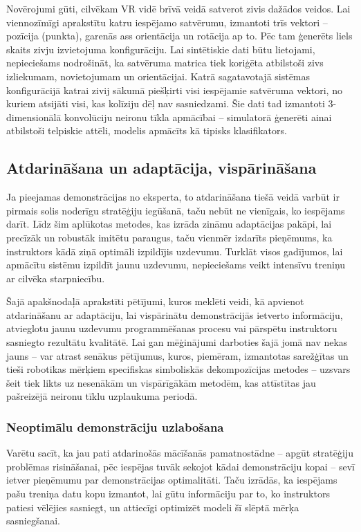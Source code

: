 \documentclass[12pt, a4paper]{article}
\numberwithin{equation}{section} %
\begin{document}
Novērojumi gūti, cilvēkam VR vidē brīvā veidā satverot zivis dažādos veidos. Lai viennozīmīgi aprakstītu katru iespējamo satvērumu, izmantoti trīs vektori -- pozīcija (punkta), garenās ass orientācija un rotācija ap to.  Pēc tam ģenerēts liels skaits zivju izvietojuma konfigurāciju. Lai sintētiskie dati būtu lietojami, nepieciešams nodrošināt, ka satvēruma matrica tiek koriģēta atbilstoši zivs izliekumam, novietojumam un orientācijai. Katrā sagatavotajā sistēmas konfigurācijā katrai zivij sākumā piešķirti visi iespējamie satvēruma vektori, no kuriem atsijāti visi, kas kolīziju dēļ nav sasniedzami. Šie dati tad izmantoti 3-dimensionālā konvolūciju neironu tīkla apmācībai -- simulatorā ģenerēti ainai atbilstoši telpiskie attēli, modelis apmācīts kā tipisks klasifikators.

\subsection{Atdarināšana un adaptācija, vispārināšana}

Ja pieejamas demonstrācijas no eksperta, to atdarināšana tiešā veidā varbūt ir pirmais solis noderīgu stratēģiju iegūšanā, taču nebūt ne vienīgais, ko iespējams darīt. Līdz šim aplūkotas metodes, kas izrāda zināmu adaptācijas pakāpi, lai precīzāk un robustāk imitētu paraugus, taču vienmēr izdarīts pieņēmums, ka instruktors kādā ziņā optimāli izpildījis uzdevumu. Turklāt visos gadījumos, lai apmācītu sistēmu izpildīt jaunu uzdevumu, nepieciešams veikt intensīvu treniņu ar cilvēka starpniecību. 

Šajā apakšnodaļā aprakstīti pētījumi, kuros meklēti veidi, kā apvienot atdarināšanu ar adaptāciju, lai vispārinātu demonstrācijās ietverto informāciju, atvieglotu jaunu uzdevumu programmēšanas procesu vai pārspētu instruktoru sasniegto rezultātu kvalitātē. Lai gan mēģinājumi darboties šajā jomā nav nekas jauns -- var atrast senākus pētījumus, kuros, piemēram, izmantotas sarežģītas un tieši robotikas mērķiem specifiskas simboliskās dekompozīcijas metodes \cite{pastor2011skill} -- uzsvars šeit tiek likts uz nesenākām un vispārīgākām metodēm, kas attīstītas jau pašreizējā neironu tīklu uzplaukuma periodā.

\subsubsection{Neoptimālu demonstrāciju uzlabošana}

Varētu sacīt, ka jau pati atdarinošās mācīšanās pamatnostādne -- apgūt stratēģiju problēmas risināšanai, pēc iespējas tuvāk sekojot kādai demonstrāciju kopai -- sevī ietver pieņēmumu par demonstrācijas optimalitāti. Taču izrādās, ka iespējams pašu treniņa datu kopu izmantot, lai gūtu informāciju par to, ko instruktors patiesi vēlējies sasniegt, un attiecīgi optimizēt modeli šī slēptā mērķa sasniegšanai.
\end{document}
